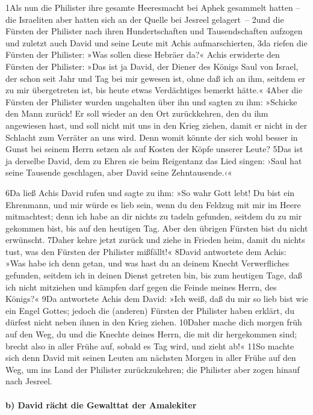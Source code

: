 1Als nun die Philister ihre gesamte Heeresmacht bei Aphek gesammelt
hatten -- die Israeliten aber hatten sich an der Quelle bei Jesreel
gelagert~-- 2und die Fürsten der Philister nach ihren Hundertschaften
und Tausendschaften aufzogen und zuletzt auch David und seine Leute mit
Achis aufmarschierten, 3da riefen die Fürsten der Philister: »Was sollen
diese Hebräer da?« Achis erwiderte den Fürsten der Philister: »Das ist
ja David, der Diener des Königs Saul von Israel, der schon seit Jahr und
Tag bei mir gewesen ist, ohne daß ich an ihm, seitdem er zu mir
übergetreten ist, bis heute etwas Verdächtiges bemerkt hätte.« 4Aber die
Fürsten der Philister wurden ungehalten über ihn und sagten zu ihm:
»Schicke den Mann zurück! Er soll wieder an den Ort zurückkehren, den du
ihm angewiesen hast, und soll nicht mit uns in den Krieg ziehen, damit
er nicht in der Schlacht zum Verräter an uns wird. Denn womit könnte der
sich wohl besser in Gunst bei seinem Herrn setzen als auf Kosten der
Köpfe unserer Leute? 5Das ist ja derselbe David, dem zu Ehren sie beim
Reigentanz das Lied singen: ›Saul hat seine Tausende geschlagen, aber
David seine Zehntausende.‹«

6Da ließ Achis David rufen und sagte zu ihm: »So wahr Gott lebt! Du bist
ein Ehrenmann, und mir würde es lieb sein, wenn du den Feldzug mit mir
im Heere mitmachtest; denn ich habe an dir nichts zu tadeln gefunden,
seitdem du zu mir gekommen bist, bis auf den heutigen Tag. Aber den
übrigen Fürsten bist du nicht erwünscht. 7Daher kehre jetzt zurück und
ziehe in Frieden heim, damit du nichts tust, was den Fürsten der
Philister mißfällt!« 8David antwortete dem Achis: »Was habe ich denn
getan, und was hast du an deinem Knecht Verwerfliches gefunden, seitdem
ich in deinen Dienst getreten bin, bis zum heutigen Tage, daß ich nicht
mitziehen und kämpfen darf gegen die Feinde meines Herrn, des Königs?«
9Da antwortete Achis dem David: »Ich weiß, daß du mir so lieb bist wie
ein Engel Gottes; jedoch die (anderen) Fürsten der Philister haben
erklärt, du dürfest nicht neben ihnen in den Krieg ziehen. 10Daher mache
dich morgen früh auf den Weg, du und die Knechte deines Herrn, die mit
dir hergekommen sind; brecht also in aller Frühe auf, sobald es Tag
wird, und zieht ab!« 11So machte sich denn David mit seinen Leuten am
nächsten Morgen in aller Frühe auf den Weg, um ins Land der Philister
zurückzukehren; die Philister aber zogen hinauf nach Jesreel.

\hypertarget{b-david-ruxe4cht-die-gewalttat-der-amalekiter}{%
\paragraph{b) David rächt die Gewalttat der
Amalekiter}\label{b-david-ruxe4cht-die-gewalttat-der-amalekiter}}

